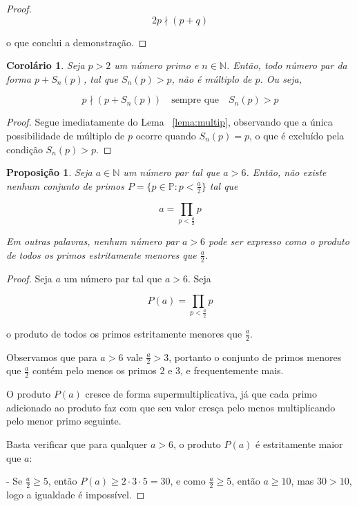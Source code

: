 \documentclass[a4paper,11pt]{article}
\newtheorem{proposition}[theorem]{Proposição}
\newtheorem{corollary}[theorem]{Corolário}
\theoremstyle{definition}
\theoremstyle{remark}
\begin{document}
\begin{otherlanguage}{brazil}
\begin{proof}
		\[
		2p \nmid (p + q)
		\]
		
		o que conclui a demonstração.
	\end{proof}
	
	\begin{corollary}
		Seja \(p > 2\) um número primo e \(n \in \mathbb{N}\). Então, todo número par da forma \(p + S_n(p)\), tal que \(S_n(p) > p\), não é múltiplo de \(p\). Ou seja,
		
		\[
		p \nmid (p + S_n(p)) \quad \text{sempre que} \quad S_n(p) > p
		\]
		
	\end{corollary}
	
	\begin{proof}
		Segue imediatamente do Lema ~\ref{lema:multip}, observando que a única possibilidade de múltiplo de \(p\) ocorre quando \(S_n(p) = p\), o que é excluído pela condição \(S_n(p) > p\).
	\end{proof}
	
	
	\begin{proposition}\label{prop: produto_p_menores_a_meio}
		Seja \(a \in \mathbb{N}\) um número par tal que \(a > 6\). Então, não existe nenhum conjunto de primos \(P = \{p \in \mathbb{P} : p < \frac{a}{2}\}\) tal que
		
		\[
		a = \prod_{p < \frac{a}{2}} p
		\]
		
		Em outras palavras, nenhum número par \(a > 6\) pode ser expresso como o produto de todos os primos estritamente menores que \(\frac{a}{2}\).
	\end{proposition}
	
	\begin{proof}
		Seja \(a\) um número par tal que \(a > 6\). Seja
		
		\[
		P(a) = \prod_{p < \frac{a}{2}} p
		\]
		
		o produto de todos os primos estritamente menores que \(\frac{a}{2}\).
		
		Observamos que para \(a > 6\) vale \(\frac{a}{2} > 3\), portanto o conjunto de primos menores que \(\frac{a}{2}\) contém pelo menos os primos 2 e 3, e frequentemente mais.
		
		O produto \(P(a)\) cresce de forma supermultiplicativa, já que cada primo adicionado ao produto faz com que seu valor cresça pelo menos multiplicando pelo menor primo seguinte.
		
		Basta verificar que para qualquer \(a > 6\), o produto \(P(a)\) é estritamente maior que \(a\):
		
		- Se \(\frac{a}{2} \geq 5\), então \(P(a) \geq 2 \cdot 3 \cdot 5 = 30\), e como \(\frac{a}{2} \geq 5\), então \(a \geq 10\), mas \(30 > 10\), logo a igualdade é impossível.
		

\end{proof}
\end{otherlanguage}
\end{document}
